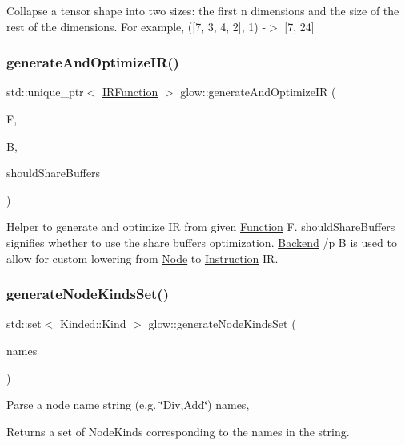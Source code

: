 Collapse a tensor shape into two sizes\+: the first n dimensions and the size of the rest of the dimensions. For example, (\mbox{[}7, 3, 4, 2\mbox{]}, 1) -\/$>$ \mbox{[}7, 24\mbox{]} \mbox{\label{namespaceglow_a100064cb8d6d8c2aae54f4a114cf48f4}} 
\subsubsection{\texorpdfstring{generate\+And\+Optimize\+I\+R()}{generateAndOptimizeIR()}}
{\footnotesize\ttfamily std\+::unique\+\_\+ptr$<$ \hyperlink{classglow_1_1_i_r_function}{I\+R\+Function} $>$ glow\+::generate\+And\+Optimize\+IR (\begin{DoxyParamCaption}\item[{\hyperlink{classglow_1_1_function}{Function} $\ast$}]{F,  }\item[{const \hyperlink{classglow_1_1_backend}{Backend} \&}]{B,  }\item[{bool}]{should\+Share\+Buffers }\end{DoxyParamCaption})}

Helper to generate and optimize IR from given \hyperlink{classglow_1_1_function}{Function} {\ttfamily F}. {\ttfamily should\+Share\+Buffers} signifies whether to use the share buffers optimization. \hyperlink{classglow_1_1_backend}{Backend} /p B is used to allow for custom lowering from \hyperlink{classglow_1_1_node}{Node} to \hyperlink{classglow_1_1_instruction}{Instruction} IR. \mbox{\label{namespaceglow_a9d06550bdaa17730cb67e8a086db767c}} 
\subsubsection{\texorpdfstring{generate\+Node\+Kinds\+Set()}{generateNodeKindsSet()}}
{\footnotesize\ttfamily std\+::set$<$ Kinded\+::\+Kind $>$ glow\+::generate\+Node\+Kinds\+Set (\begin{DoxyParamCaption}\item[{llvm\+::\+String\+Ref}]{names }\end{DoxyParamCaption})}

Parse a node name string (e.\+g. \char`\"{}\+Div,\+Add\char`\"{}) {\ttfamily names}, \begin{DoxyReturn}{Returns}
a set of Node\+Kinds corresponding to the names in the string. 
\end{DoxyReturn}
\mbox{\label{namespaceglow_a44d3450f4f150909deaf8e5939537d51}} 
